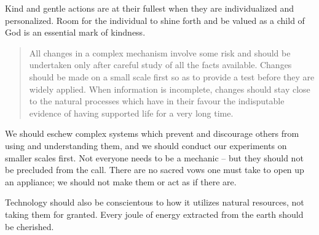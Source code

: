 \documentclass[letterpaper]{article}
\begin{document}
    Kind and gentle actions are at their fullest when they are individualized and personalized. Room for the individual to shine forth and be valued as a child of God is an essential mark of kindness.

    \begin{quote}
      All changes in a complex mechanism involve some risk and should be undertaken only after careful study of all the facts available. Changes should be made on a small scale first so as to provide a test before they are widely applied. When information is incomplete, changes should stay close to the natural processes which have in their favour the indisputable evidence of having supported life for a very long time.
    \end{quote}

    We should eschew complex systems which prevent and discourage others from using and understanding them, and we should conduct our experiments on smaller scales first. Not everyone needs to be a mechanic -- but they should not be precluded from the call. There are no sacred vows one must take to open up an appliance; we should not make them or act as if there are.

    Technology should also be conscientous to how it utilizes natural resources, not taking them for granted. Every joule of energy extracted from the earth should be cherished.


    



    




\end{document}
